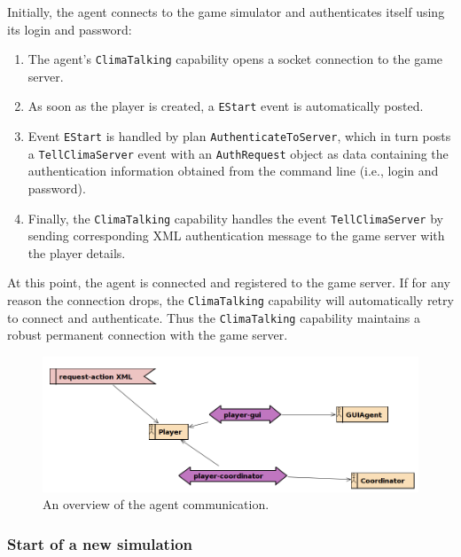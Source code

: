 \documentclass[10pt]{article}
\begin{document}
Initially, the agent connects to the game simulator and authenticates itself
using its login and password:
\begin{enumerate}
 \item The agent's \texttt{ClimaTalking} capability opens a socket
connection to the game server.

\item As soon as the player is created, a \texttt{EStart} event is 
automatically
posted.

\item Event \texttt{EStart} is handled by plan \texttt{AuthenticateToServer},
which in turn posts a \texttt{TellClimaServer} event with an
\texttt{AuthRequest} object as data containing the authentication information
obtained from the command line (i.e., login and password).

\item Finally, the \texttt{ClimaTalking} capability handles the event
\texttt{TellClimaServer} by sending corresponding XML authentication message to
the game server with the player details.
\end{enumerate}


At this point, the agent is connected and registered to the game
server. If for any reason the connection drops, the \texttt{ClimaTalking}
capability will automatically retry to connect and authenticate. Thus
the \texttt{ClimaTalking} capability maintains a robust permanent connection
with the game server.


\begin{figure}[t]
\begin{center}
\includegraphics[scale=0.4]{agent-comm}
\end{center}
\caption{An overview of the agent communication.}
\label{fig:design_communication}
\end{figure}

\subsubsection*{Start of a new simulation}
\end{document}
